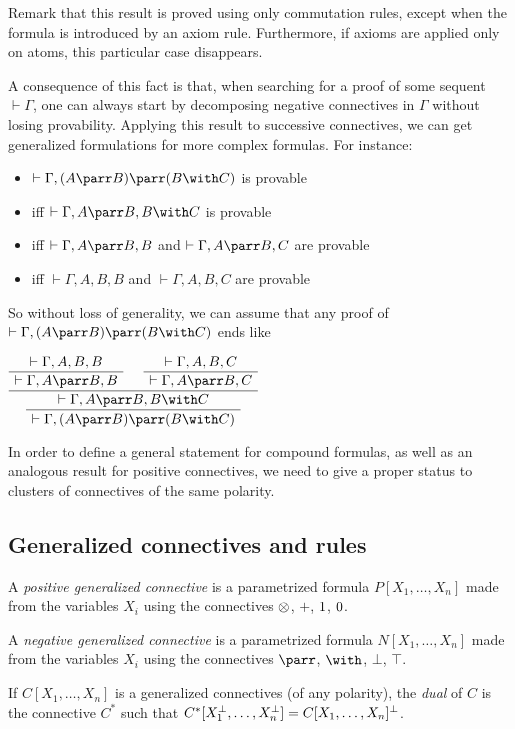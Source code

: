 Remark that this result is proved using only commutation rules, except
when the formula is introduced by an axiom rule. Furthermore, if axioms
are applied only on atoms, this particular case disappears.

A consequence of this fact is that, when searching for a proof of some
sequent \(\vdash\Gamma\), one can always start by decomposing negative
connectives in \(\Gamma\) without losing provability. Applying this
result to successive connectives, we can get generalized formulations
for more complex formulas. For instance:

\begin{itemize}
\tightlist
\item
  \(\vdash\Gamma,(A\parr B)\parr(B\with C)\) is provable
\item
  iff \(\vdash\Gamma,A\parr B,B\with C\) is provable
\item
  iff \(\vdash\Gamma,A\parr B,B\) and \(\vdash\Gamma,A\parr B,C\) are
  provable
\item
  iff \(\vdash\Gamma,A,B,B\) and \(\vdash\Gamma,A,B,C\) are provable
\end{itemize}

So without loss of generality, we can assume that any proof of
\(\vdash\Gamma,(A\parr B)\parr(B\with C)\) ends like

\(\AxRule{ \vdash \Gamma, A, B, B }
  \UnaRule{ \vdash \Gamma, A\parr B, B }
  \AxRule{ \vdash \Gamma, A, B, C }
  \UnaRule{ \vdash \Gamma, A\parr B, C }
  \BinRule{ \vdash \Gamma, A\parr B, B\with C }
  \UnaRule{ \vdash \Gamma, (A\parr B)\parr(B\with C) }
  \DisplayProof\)

In order to define a general statement for compound formulas, as well as
an analogous result for positive connectives, we need to give a proper
status to clusters of connectives of the same polarity.

\subsection{Generalized connectives and
rules}\label{generalized-connectives-and-rules}

\begin{definition}
A \emph{positive generalized connective} is a parametrized formula
$P[X_1,\ldots,X_n]$ made from the variables $X_i$ using the connectives
$\otimes$, $\plus$, $1$, $0$.

A \emph{negative generalized connective} is a parametrized formula
$N[X_1,\ldots,X_n]$ made from the variables $X_i$ using the connectives
$\parr$, $\with$, $\bot$, $\top$.

If $C[X_1,\ldots,X_n]$ is a generalized connectives (of any polarity), the
\emph{dual} of $C$ is the connective $C^*$ such that
$C^*[X_1^\bot,\ldots,X_n^\bot]=C[X_1,\ldots,X_n]^\bot$.
\end{definition}

